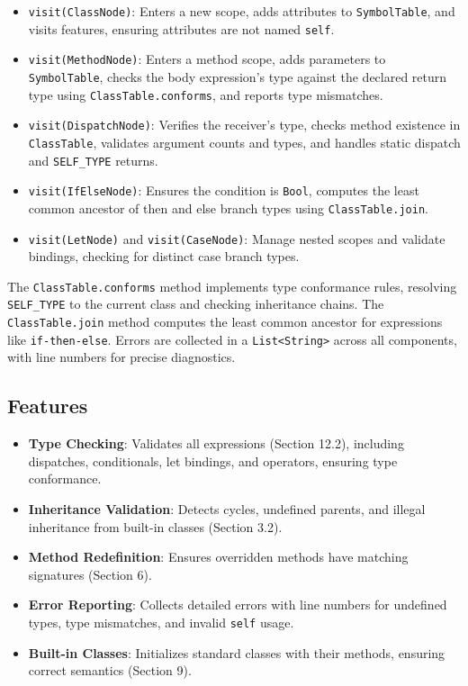 \documentclass[11pt, titlepage]{article}
\begin{document}
\begin{itemize}[leftmargin=*]
    \item \texttt{visit(ClassNode)}: Enters a new scope, adds attributes to \texttt{SymbolTable}, and visits features, ensuring attributes are not named \texttt{self}.
    \item \texttt{visit(MethodNode)}: Enters a method scope, adds parameters to \texttt{SymbolTable}, checks the body expression's type against the declared return type using \texttt{ClassTable.conforms}, and reports type mismatches.
    \item \texttt{visit(DispatchNode)}: Verifies the receiver's type, checks method existence in \texttt{ClassTable}, validates argument counts and types, and handles static dispatch and \texttt{SELF\_TYPE} returns.
    \item \texttt{visit(IfElseNode)}: Ensures the condition is \texttt{Bool}, computes the least common ancestor of then and else branch types using \texttt{ClassTable.join}.
    \item \texttt{visit(LetNode)} and \texttt{visit(CaseNode)}: Manage nested scopes and validate bindings, checking for distinct case branch types.

\end{itemize}

The \texttt{ClassTable.conforms} method implements type conformance rules, resolving \texttt{SELF\_TYPE} to the current class and checking inheritance chains. The \texttt{ClassTable.join} method computes the least common ancestor for expressions like \texttt{if-then-else}. Errors are collected in a \texttt{List<String>} across all components, with line numbers for precise diagnostics.

\subsection{Features}
\begin{itemize}[leftmargin=*]
    \item \textbf{Type Checking}: Validates all expressions (Section 12.2), including dispatches, conditionals, let bindings, and operators, ensuring type conformance.
    \item \textbf{Inheritance Validation}: Detects cycles, undefined parents, and illegal inheritance from built-in classes (Section 3.2).
    \item \textbf{Method Redefinition}: Ensures overridden methods have matching signatures (Section 6).
    \item \textbf{Error Reporting}: Collects detailed errors with line numbers for undefined types, type mismatches, and invalid \texttt{self} usage.
    \item \textbf{Built-in Classes}: Initializes standard classes with their methods, ensuring correct semantics (Section 9).
\end{itemize}
\end{document}

